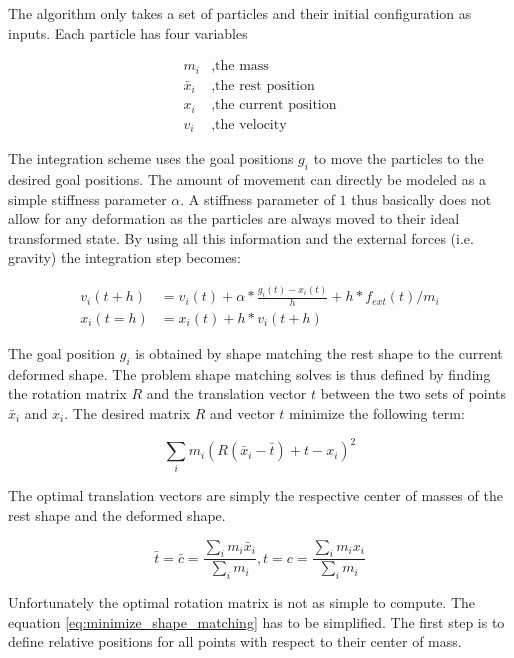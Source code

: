The algorithm only takes a set of particles and their initial configuration as inputs. Each particle has four variables

\begin{align*}
m_i &, \text{the mass} \\
\bar{x}_i &, \text{the rest position} \\
x_i &, \text{the current position} \\
v_i &, \text{the velocity}
\end{align*}

The integration scheme uses the goal positions \(g_i\) to move the particles to the desired goal positions. The amount of movement can directly be modeled as a simple stiffness parameter \(\alpha\). A stiffness parameter of \(1\) thus basically does not allow for any deformation as the particles are always moved to their ideal transformed state. By using all this information and the external forces (i.e. gravity) the integration step becomes:

\begin{align}
v_i(t+h) &= v_i(t) + \alpha * \frac{g_i(t)-x_i(t)}{h} + h * f_{ext}(t)/m_i \\
x_i(t=h) &= x_i(t) + h * v_i(t+h)
\end{align}

The goal position \(g_i\) is obtained by shape matching the rest shape to the current deformed shape. The problem shape matching solves is thus defined by finding the rotation matrix \(R\) and the translation vector \(t\) between the two sets of points \(\bar{x}_i\) and \(x_i\). The desired matrix \(R\) and vector \(t\) minimize the following term:

\begin{equation}
\sum\limits_i m_i(R(\bar{x}_i-\bar{t})+t-x_i)^2
\label{eq:minimize_shape_matching}
\end{equation}

The optimal translation vectors are simply the respective center of masses of the rest shape and the deformed shape.

\begin{equation}
\bar{t} = \bar{c} = \frac{\sum_{i} m_i \bar{x}_i}{\sum_{i}m_i}, t = c = \frac{\sum_{i} m_i x_i}{\sum_{i}m_i}
\end{equation}

Unfortunately the optimal rotation matrix is not as simple to compute. The equation \ref{eq:minimize_shape_matching} has to be simplified. The first step is to define relative positions for all points with respect to their center of mass.

